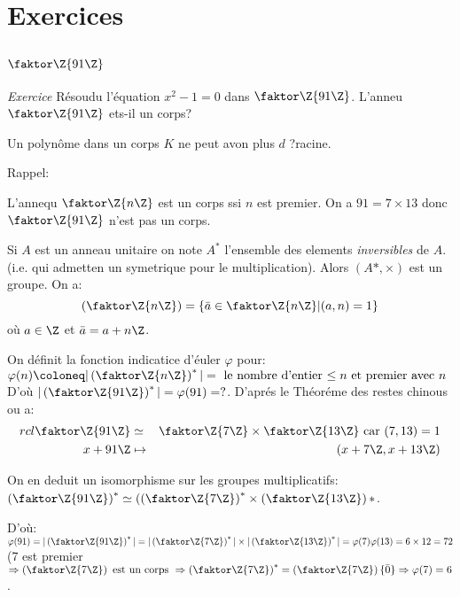 
\chapter{Exercices}

\section{$\faktor\Z{91\Z}$}

\emph{Exercice}
Résoudu l'équation $x^2-1=0$ dans $\faktor\Z{91\Z}$. L'anneu $\faktor\Z{91\Z}$ ets-il un corps?
\begin{remark}
	Un polynôme dans un corps $K$ ne peut avon plus $d$ ?racine.
\end{remark}

Rappel:

L'annequ $\faktor\Z{n\Z}$ est un corps ssi $n$ est premier. On a $91=7\times 13$ donc $\faktor\Z{91\Z}$ n'est pas un corps.

Si $A$ est un anneau unitaire on note $A^{\ast}$ l'ensemble des elements \emph{inversibles} de $A$. (i.e. qui admetten un symetrique pour le multiplication). Alors $(A\ast,\times)$ est un groupe. On a:
$$(\faktor\Z{n\Z})=\{\bar a\in \faktor\Z{n\Z}|(a,n)=1\}$$ où $a\in\Z$ et $\bar a=a+n\Z$.

On définit la fonction indicatice d'éuler $\varphi $ pour: $\varphi (n)\coloneq|\left(\faktor\Z{n\Z}\right)^\ast|=\mbox{ le nombre d'entier $\leq n$ et premier avec $n$}$ D'où $|\left(\faktor\Z{91\Z}\right)^\ast|=\varphi (91)=?$. D'aprés le Théoréme des restes chinous ou a:
\begin{align}{rcl}
	\faktor\Z{91\Z} &\simeq& \faktor\Z{7\Z}\times \faktor\Z{13\Z}\text{ car } (7,13)=1\\
	x+91\Z &\mapsto& (x+7\Z,x+13\Z)
\end{align}

On en deduit un isomorphisme sur les groupes multiplicatifs: $\left(\faktor\Z{91\Z}\right)^\ast\simeq(\left(\faktor\Z{7\Z}\right)^\ast\times \left(\faktor\Z{13\Z}\right)
\ast$. 

D'où: $\varphi (91)=|\left(\faktor\Z{91\Z}\right)^\ast |=|\left(\faktor\Z{7\Z}\right)^\ast|\times|\left(\faktor\Z{13\Z}\right)^\ast|= \varphi (7)\varphi (13)=6\times 12=72$
(7 est premier $\Rightarrow \left(\faktor\Z{7\Z}\right) \text{ est un corps } \Rightarrow \left(\faktor\Z{7\Z}\right)^\ast=\left(\faktor\Z{7\Z}\right)\\ \{\bar 0\} \Rightarrow \varphi (7)=6$.

